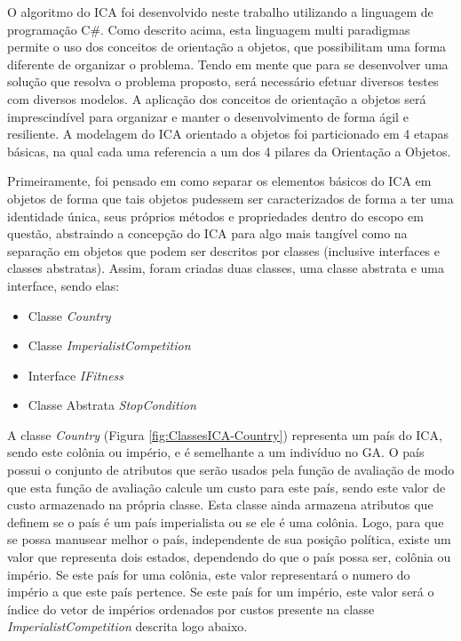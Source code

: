 O algoritmo do ICA foi desenvolvido neste trabalho utilizando a linguagem de programação C\#. Como descrito acima, esta linguagem multi paradigmas permite o uso dos conceitos de orientação a objetos, que possibilitam uma forma diferente de organizar o problema. Tendo em mente que para se desenvolver uma solução que resolva o problema proposto, será necessário efetuar diversos testes com diversos modelos. A aplicação dos conceitos de orientação a objetos será imprescindível para organizar e manter o desenvolvimento de forma ágil e resiliente. A modelagem do ICA orientado a objetos foi particionado em 4 etapas básicas, na qual cada uma referencia a um dos 4 pilares da Orientação a Objetos.

Primeiramente, foi pensado em como separar os elementos básicos do ICA em objetos de forma que tais objetos pudessem ser caracterizados de forma a ter uma identidade única, seus próprios métodos e propriedades dentro do escopo em questão, abstraindo a concepção do ICA para algo mais tangível como na separação em objetos que podem ser descritos por classes (inclusive interfaces e classes abstratas). Assim, foram criadas duas classes, uma classe abstrata e uma interface, sendo elas:
\begin{itemize}
\item Classe \emph{ Country }
\item Classe \emph{ImperialistCompetition  }
\item Interface \emph{IFitness}
\item Classe Abstrata \emph{ StopCondition}
\end{itemize}

A classe \emph{Country} (Figura \ref{fig:ClassesICA-Country})  representa um país do ICA, sendo este colônia ou império, e é semelhante a um indivíduo no GA. O país possui o conjunto de atributos que serão usados pela função de avaliação de modo que esta função de avaliação calcule um custo para este país, sendo este valor de custo armazenado na própria classe. Esta classe ainda armazena atributos que definem se o país é um país imperialista ou se ele é uma colônia. Logo, para que se possa manusear melhor o país, independente de sua posição política, existe um valor que representa dois estados, dependendo do que o país possa ser, colônia ou império. Se este país for uma colônia, este valor representará o numero do império a que este país pertence. Se este país for um império, este valor será o índice do vetor de impérios ordenados por custos presente na classe \emph{ImperialistCompetition} descrita logo abaixo.

